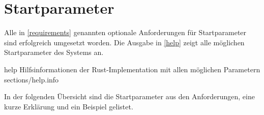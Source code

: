 \clearpage
\section{Startparameter}

Alle in \autoref{requirements} genannten optionale Anforderungen für Startparameter sind erfolgreich umgesetzt worden.
Die Ausgabe in \autoref{help} zeigt alle möglichen Startparameter des Systems an.

\helpinclude
	{help}
	{Hilfsinformationen der Rust-Implementation mit allen möglichen Parametern}
	{sections/help.info}


In der folgenden Übersicht sind die Startparameter aus den Anforderungen, eine kurze Erklärung und ein Beispiel gelistet.

\newcommand{\proveReq}[3]{\textbf{Anforderung \reqNumberForLabel{#1}: \reqNameForLabel{#1}} \\ #2 \\ Beispiel: \monospaceinline{mecview_server #3}}

